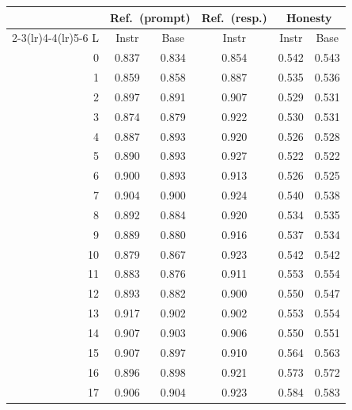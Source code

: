\documentclass[11pt]{article}
\begin{document}
\renewcommand{\arraystretch}{0.85}
\par\medskip
{\centering
  \small
  \setlength{\tabcolsep}{4pt}
  \begin{tabular}{rccccc}
    \toprule
    & \multicolumn{2}{c}{Ref.\ (prompt)} & Ref.\ (resp.) & \multicolumn{2}{c}{Honesty} \\
    \cmidrule(lr){2-3}\cmidrule(lr){4-4}\cmidrule(lr){5-6}
    L & Instr & Base & Instr & Instr & Base \\
    \midrule
    0 & 0.837 & 0.834 & 0.854 & 0.542 & 0.543 \\
    1 & 0.859 & 0.858 & 0.887 & 0.535 & 0.536 \\
    2 & 0.897 & 0.891 & 0.907 & 0.529 & 0.531 \\
    3 & 0.874 & 0.879 & 0.922 & 0.530 & 0.531 \\
    4 & 0.887 & 0.893 & 0.920 & 0.526 & 0.528 \\
    5 & 0.890 & 0.893 & 0.927 & 0.522 & 0.522 \\
    6 & 0.900 & 0.893 & 0.913 & 0.526 & 0.525 \\
    7 & 0.904 & 0.900 & 0.924 & 0.540 & 0.538 \\
    8 & 0.892 & 0.884 & 0.920 & 0.534 & 0.535 \\
    9 & 0.889 & 0.880 & 0.916 & 0.537 & 0.534 \\
    10 & 0.879 & 0.867 & 0.923 & 0.542 & 0.542 \\
    11 & 0.883 & 0.876 & 0.911 & 0.553 & 0.554 \\
    12 & 0.893 & 0.882 & 0.900 & 0.550 & 0.547 \\
    13 & 0.917 & 0.902 & 0.902 & 0.553 & 0.554 \\
    14 & 0.907 & 0.903 & 0.906 & 0.550 & 0.551 \\
    15 & 0.907 & 0.897 & 0.910 & 0.564 & 0.563 \\
    16 & 0.896 & 0.898 & 0.921 & 0.573 & 0.572 \\
    17 & 0.906 & 0.904 & 0.923 & 0.584 & 0.583 \\
    \bottomrule
  \end{tabular}
  \label{tab:layerwise}
  \par}
\end{document}
